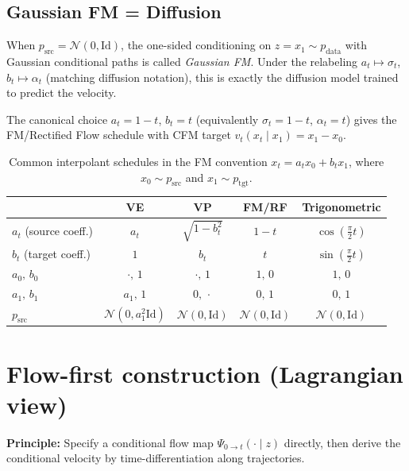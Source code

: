 \documentclass[11pt]{article}
\newcommand{\cN}{\mathcal{N}}
\newcommand{\Id}{\mathrm{Id}}
\theoremstyle{definition}
\theoremstyle{remark}
\begin{document}
\subsection{Gaussian FM = Diffusion}

When $p_{\mathrm{src}} = \cN(0,\Id)$, the one-sided conditioning on $z = x_1\sim p_{\mathrm{data}}$ with Gaussian conditional paths is called \emph{Gaussian FM}.
Under the relabeling $a_t \mapsto \sigma_t$, $b_t \mapsto \alpha_t$ (matching diffusion notation), this is exactly the diffusion model trained to predict the velocity.

The canonical choice $a_t = 1-t$, $b_t = t$ (equivalently $\sigma_t = 1-t$, $\alpha_t = t$) gives the FM/Rectified Flow schedule with CFM target $v_t(x_t\mid x_1) = x_1 - x_0$.

\begin{table}[h]
\centering
\renewcommand{\arraystretch}{1.3}
\begin{tabular}{@{} l c c c c @{}}
\toprule
& \textbf{VE} & \textbf{VP} & \textbf{FM/RF} & \textbf{Trigonometric} \\
\midrule
$a_t$ (source coeff.) & $a_t$ & $\sqrt{1-b_t^2}$ & $1-t$ & $\cos(\frac{\pi}{2}t)$ \\
$b_t$ (target coeff.) & $1$ & $b_t$ & $t$ & $\sin(\frac{\pi}{2}t)$ \\
$a_0,\,b_0$ & $\cdot,\,1$ & $\cdot,\,1$ & $1,\,0$ & $1,\,0$ \\
$a_1,\,b_1$ & $a_1,\,1$ & $0,\,\cdot$ & $0,\,1$ & $0,\,1$ \\
$p_{\mathrm{src}}$ & $\cN(0,a_1^2\Id)$ & $\cN(0,\Id)$ & $\cN(0,\Id)$ & $\cN(0,\Id)$ \\
\bottomrule
\end{tabular}
\caption{Common interpolant schedules in the FM convention $x_t = a_t x_0 + b_t x_1$, where $x_0\sim p_{\mathrm{src}}$ and $x_1\sim p_{\mathrm{tgt}}$.}
\label{tab:schedules}
\end{table}

\section{Flow-first construction (Lagrangian view)}\label{sec:flow-first}

\textbf{Principle:} Specify a conditional flow map $\Psi_{0\to t}(\cdot\mid z)$ directly, then derive the conditional velocity by time-differentiation along trajectories.
\end{document}
